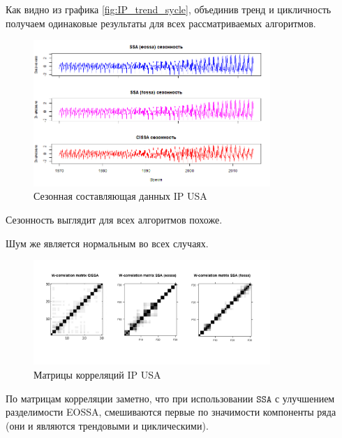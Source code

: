 \documentclass[12pt, specialist, subf
]{disser}
\theoremstyle{definition}
\newcommand{\SSA}{\texttt{SSA}}
\begin{document}
Как видно из графика \ref{fig:IP_trend_sycle}, объединив тренд и цикличность получаем одинаковые результаты для всех рассматриваемых алгоритмов.

\begin{figure}[H]
	\centering
	\includegraphics[width=0.8\textwidth]{img/trend inseparability example/IP_sesonal.jpg}
	\caption{Сезонная составляющая данных IP USA}
	\label{fig:IP_sesonal}
\end{figure}

Сезонность выглядит для всех алгоритмов похоже.

Шум же является нормальным во всех случаях.

\begin{figure}[H]
	\centering
	\includegraphics[width=0.8\textwidth]{img/trend inseparability example/W-corr.jpg}
	\caption{Матрицы корреляций IP USA}
	\label{fig:W-corr}
\end{figure}
По матрицам корреляции заметно, что при использовании $\SSA$ с улучшением разделимости EOSSA, смешиваются первые по значимости компоненты ряда (они и являются трендовыми и циклическими).

\end{document}
